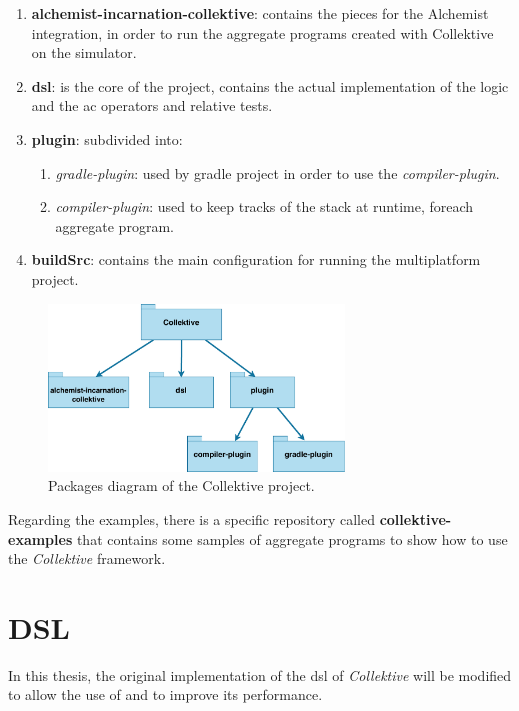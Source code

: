 \begin{enumerate}
    \item \textbf{alchemist-incarnation-collektive}: contains the pieces for the Alchemist integration,
        in order to run the aggregate programs created with Collektive on the simulator.
    \item \textbf{dsl}: is the core of the project, contains the actual implementation of the logic and the \ac{ac} operators
        and relative tests.
    \item \textbf{plugin}: subdivided into:
        \begin{enumerate}
            \item \emph{gradle-plugin}: used by gradle project in order to use the \emph{compiler-plugin}.
            \item \emph{compiler-plugin}: used to keep tracks of the stack at runtime, foreach aggregate program.
        \end{enumerate}
    \item \textbf{buildSrc}: contains the main configuration for running the multiplatform project.
\end{enumerate}

\begin{figure}[h!]
    \centering
    \includegraphics[width=0.7\textwidth]{figures/packages}
    \caption{Packages diagram of the Collektive project.}
    \label{fig:pacakges}
\end{figure}

Regarding the examples, there is a specific repository called \textbf{collektive-examples} that contains some samples of
aggregate programs to show how to use the \emph{Collektive} framework.

\section{DSL}
\label{sec:dsl}

In this thesis, the original implementation of the \ac{dsl} of \emph{Collektive} will be modified to allow the use of \xc{}
and to improve its performance.

